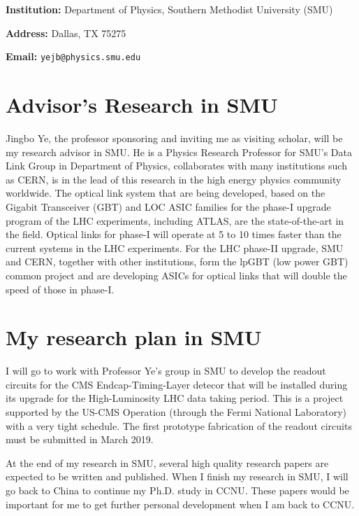 \documentclass[11pt,a4paper]{article}
\begin{document}
\begin{spacing}{1.2}
\begin{multicols}{2}

\textbf{Institution:} Department of Physics, Southern Methodist University (SMU)

\textbf{Address:} Dallas, TX 75275 
 
\textbf{Email:} \texttt{yejb@physics.smu.edu} 

\end{multicols}

\section*{Advisor's Research in SMU}     %
Jingbo Ye, the professor sponsoring and inviting me as visiting scholar, will be my research advisor in SMU. He is a Physics Research Professor for SMU's Data Link Group in Department of Physics, collaborates with many institutions such as CERN, is in the lead of this research in the high energy physics community worldwide. The optical link system that are being developed, based on the Gigabit Transceiver (GBT) and LOC ASIC families for the phase-I upgrade program of the LHC experiments, including ATLAS, are the state-of-the-art in the field. Optical links for phase-I will operate at 5 to 10 times faster than the current systems in the LHC experiments. For the LHC phase-II upgrade, SMU and CERN, together with other institutions, form the lpGBT (low power GBT) common project and are developing ASICs for optical links that will double the speed of those in phase-I.

\section*{My research plan in SMU}     %
I will go to work with Professor Ye's group in SMU to develop the readout circuits for the CMS Endcap-Timing-Layer detecor that will be installed during its upgrade for the High-Luminosity LHC data taking period. This is a project supported by the US-CMS Operation (through the Fermi National Laboratory) with a very tight schedule. The first prototype fabrication of the readout circuits must be submitted in March 2019.

At the end of my research in SMU, several high quality research papers are expected to be written and published. When I finish my research in SMU, I will go back to China to continue my Ph.D. study in CCNU. These papers would be important for me to get further personal development when I am back to CCNU.



\end{spacing}
\end{document}
